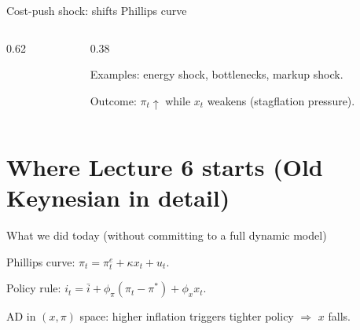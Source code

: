 \documentclass[aspectratio=169,xcolor=dvipsnames]{beamer}
\let\tempone\itemize
\let\temptwo\enditemize
\renewenvironment{itemize}{\tempone\addtolength{\itemsep}{\fill}}{\temptwo}
\begin{document}
\begin{frame}{Cost-push shock: shifts Phillips curve}
\begin{columns}
\begin{column}{0.62\textwidth}
\centering
{}
\end{column}
\begin{column}{0.38\textwidth}
\small
\begin{itemize}
\item Examples: energy shock, bottlenecks, markup shock.
\item Outcome: $\pi_t\uparrow$ while $x_t$ weakens (stagflation pressure).
\end{itemize}
\end{column}
\end{columns}
\end{frame}

\section{Where Lecture 6 starts (Old Keynesian in detail)}

\begin{frame}{What we did today (without committing to a full dynamic model)}
\begin{itemize}
\item Phillips curve: $\pi_t=\pi_t^e+\kappa x_t+u_t$.
\item Policy rule: $i_t=\bar i+\phi_\pi(\pi_t-\pi^\ast)+\phi_x x_t$.
\item AD in $(x,\pi)$ space: higher inflation triggers tighter policy $\Rightarrow$ $x$ falls.
\end{itemize}
\end{frame}
\end{document}
